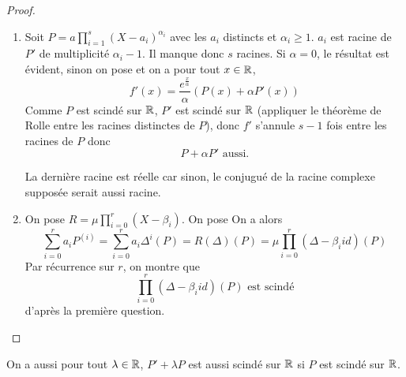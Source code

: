 \begin{proof}
	\phantom{}
	\begin{enumerate}
		\item Soit $P=a\prod_{i=1}^{s}(X-a_{i})^{\alpha_{i}}$ avec les $a_{i}$ distincts et $\alpha_{i}\geqslant1$. $a_{i}$ est racine de $P'$ de multiplicité $\alpha_{i}-1$. Il manque donc $s$ racines. Si $\alpha=0$, le résultat est évident, sinon on pose 
		et on a pour tout $x\in\mathbb{R}$,
		\begin{equation}
			f'(x)=\frac{e^{\frac{x}{\alpha}}}{\alpha}(P(x)+\alpha P'(x))
		\end{equation}
		Comme $P$ est scindé sur $\mathbb{R}$, $P'$ est scindé sur $\mathbb{R}$ (appliquer le théorème de Rolle entre les racines distinctes de $P$), donc $f'$ s'annule $s-1$ fois entre les racines de $P$ donc 
		\begin{equation}
			\boxed{P+\alpha P'\text{ aussi.}}
		\end{equation}

		La dernière racine est réelle car sinon, le conjugué de la racine complexe supposée serait aussi racine.

		\item On pose $R=\mu\prod_{i=0}^{r}(X-\beta_{i})$. On pose 
		On a alors 
		\begin{equation}
			\sum_{i=0}^{r}a_{i}P^{(i)}=\sum_{i=0}^{r}a_{i}\Delta^{i}(P)=R(\Delta)(P)=\mu\prod_{i=0}^{r}(\Delta-\beta_{i}id)(P)
		\end{equation}
		Par récurrence sur $r$, on montre que 
		\begin{equation}
			\boxed{\prod_{i=0}^{r}(\Delta-\beta_{i}id)(P)\text{ est scindé}}
		\end{equation} 
		d'après la première question.
	\end{enumerate}
\end{proof}

\begin{remark}
	On a aussi pour tout $\lambda\in\mathbb{R}$, $P'+\lambda P$ est aussi scindé sur $\mathbb{R}$ si $P$ est scindé sur $\mathbb{R}$.
\end{remark}

